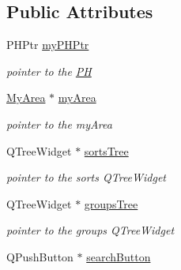 \subsection*{Public Attributes}
\begin{DoxyCompactItemize}
\item 
\hypertarget{classTreeArea_a290d659da16085f21c04f81fcd16891c}{P\+H\+Ptr \hyperlink{classTreeArea_a290d659da16085f21c04f81fcd16891c}{my\+P\+H\+Ptr}}\label{classTreeArea_a290d659da16085f21c04f81fcd16891c}

\begin{DoxyCompactList}\small\item\em pointer to the \hyperlink{classPH}{P\+H} \end{DoxyCompactList}\item 
\hypertarget{classTreeArea_a1bd090dc9ab10415e8f897b6300bc555}{\hyperlink{classMyArea}{My\+Area} $\ast$ \hyperlink{classTreeArea_a1bd090dc9ab10415e8f897b6300bc555}{my\+Area}}\label{classTreeArea_a1bd090dc9ab10415e8f897b6300bc555}

\begin{DoxyCompactList}\small\item\em pointer to the my\+Area \end{DoxyCompactList}\item 
\hypertarget{classTreeArea_ad323879d9e2e64b18dae18fe757b1b0e}{Q\+Tree\+Widget $\ast$ \hyperlink{classTreeArea_ad323879d9e2e64b18dae18fe757b1b0e}{sorts\+Tree}}\label{classTreeArea_ad323879d9e2e64b18dae18fe757b1b0e}

\begin{DoxyCompactList}\small\item\em pointer to the sorts Q\+Tree\+Widget \end{DoxyCompactList}\item 
\hypertarget{classTreeArea_ab3cf8ca35655b0bace24a7c46170852f}{Q\+Tree\+Widget $\ast$ \hyperlink{classTreeArea_ab3cf8ca35655b0bace24a7c46170852f}{groups\+Tree}}\label{classTreeArea_ab3cf8ca35655b0bace24a7c46170852f}

\begin{DoxyCompactList}\small\item\em pointer to the groups Q\+Tree\+Widget \end{DoxyCompactList}\item 
\hypertarget{classTreeArea_a682ba9e29364cbfca7ad726a6a630907}{Q\+Push\+Button $\ast$ \hyperlink{classTreeArea_a682ba9e29364cbfca7ad726a6a630907}{search\+Button}}\label{classTreeArea_a682ba9e29364cbfca7ad726a6a630907}


\end{DoxyCompactItemize}
